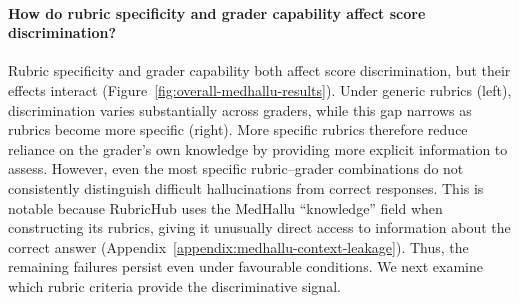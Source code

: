 \documentclass{article}
\begin{document}
\paragraph{\textbf{How do rubric specificity and grader capability affect score discrimination?}}
 Rubric specificity and grader capability both affect score discrimination, but their effects interact (Figure~\ref{fig:overall-medhallu-results}). Under generic rubrics (left), discrimination varies substantially across graders, while this gap narrows as rubrics become more specific (right). More specific rubrics therefore reduce reliance on the grader's own knowledge by providing more explicit information to assess. However, even the most specific rubric--grader combinations do not consistently distinguish difficult hallucinations from correct responses. This is notable because RubricHub uses the MedHallu ``knowledge'' field when constructing its rubrics, giving it unusually direct access to information about the correct answer (Appendix~\ref{appendix:medhallu-context-leakage}). Thus, the remaining failures persist even under favourable conditions. We next examine which rubric criteria provide the discriminative signal.
\end{document}
